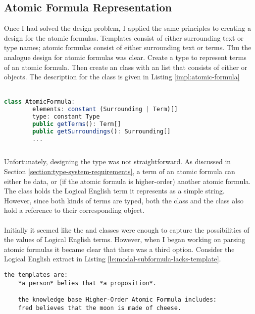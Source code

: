 \documentclass[../main.tex]{subfiles}
\begin{document}
\subsection{Atomic Formula Representation}
Once I had solved the  design problem, I applied the same principles to creating a design for the atomic formulas. Templates consist of either surrounding text or type names; atomic formulas consist of either surrounding text or terms. Thu the analogue design for atomic formulas was clear. Create a type  to represent terms of an atomic formula. Then create an  class with an  list that consists of either  or  objects. The description for the  class is given in Listing \ref{impl:atomic-formula}
\\
\\
\begin{lstlisting}[language={TypeScript}, label={impl:atomic-formula}, caption={An overview of the \codeword{AtomicFormula} class.}]
    class AtomicFormula:
        elements: constant (Surrounding | Term)[]
        type: constant Type
        public getTerms(): Term[]
        public getSurroundings(): Surrounding[]
        ...
        
\end{lstlisting}
Unfortunately, designing the type  was not straightforward. As discussed in Section \ref{section:type-system-requirements}, a term of an atomic formula can either be data, or (if the atomic formula is higher-order) another atomic formula. The  class holds the Logical English term it represents as a simple string. However, since both kinds of terms are typed, both the  class and the  class also  hold a reference to their corresponding  object.
\\
\\
Initially it seemed like the  and  classes were enough to capture the possibilities of the values of Logical English terms. However, when I began working on parsing atomic formulas it became clear that there was a third option. Consider the Logical English extract in Listing \ref{le:modal-subformula-lacks-template}.
\begin{lstlisting}[language={LE}, caption={An extract of a Logical English document containing a higher-order atomic formula, in which the argument atomic formula does not match a template. Neither the \codeword{Data} class nor the \codeword{AtomicFormula} class can properly represent the argument atomic formula.}, label={le:modal-subformula-lacks-template}]
    the templates are:
    *a person* belies that *a proposition*.

    the knowledge base Higher-Order Atomic Formula includes:
    fred believes that the moon is made of cheese.
\end{lstlisting}
\end{document}
